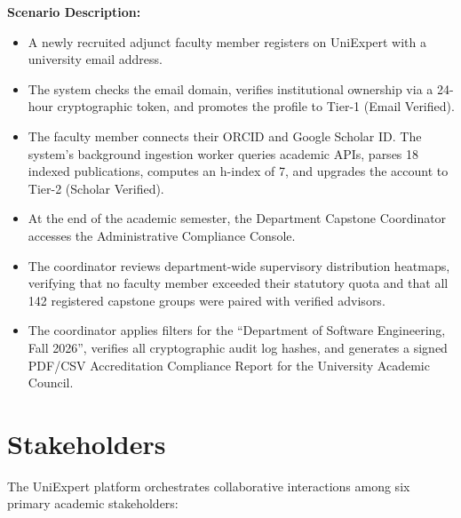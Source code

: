 \noindent\textbf{Scenario Description:}
\begin{itemize}[label=\textbf{\tiny\ensuremath{\blacksquare}}]
    \item A newly recruited adjunct faculty member registers on UniExpert with a university email address.
    \item The system checks the email domain, verifies institutional ownership via a 24-hour cryptographic token, and promotes the profile to Tier-1 (Email Verified).
    \item The faculty member connects their ORCID and Google Scholar ID. The system's background ingestion worker queries academic APIs, parses 18 indexed publications, computes an h-index of 7, and upgrades the account to Tier-2 (Scholar Verified).
    \item At the end of the academic semester, the Department Capstone Coordinator accesses the Administrative Compliance Console.
    \item The coordinator reviews department-wide supervisory distribution heatmaps, verifying that no faculty member exceeded their statutory quota and that all 142 registered capstone groups were paired with verified advisors.
    \item The coordinator applies filters for the ``Department of Software Engineering, Fall 2026'', verifies all cryptographic audit log hashes, and generates a signed PDF/CSV Accreditation Compliance Report for the University Academic Council.
\end{itemize}

\section{Stakeholders}
\label{sec:stakeholders}

The UniExpert platform orchestrates collaborative interactions among six primary academic stakeholders:

